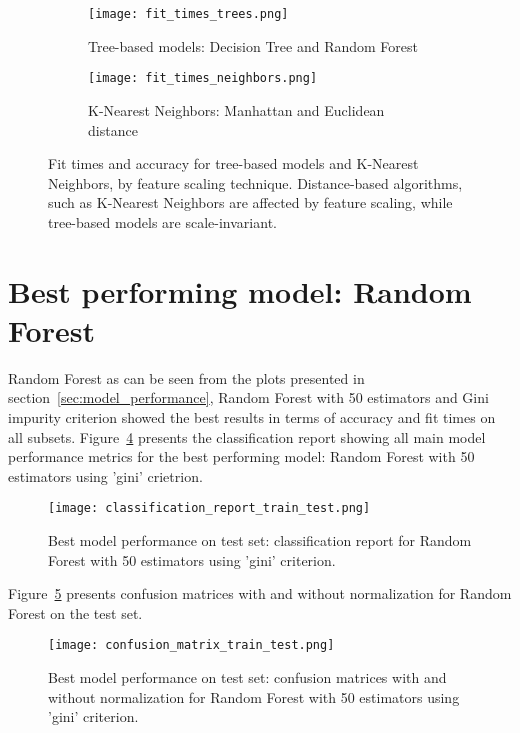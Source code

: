 \begin{figure}[ht]
    \centering
    \begin{subfigure}{\linewidth}
        \centering
        \texttt{[image: fit\_times\_trees.png]}
        \label{fig:fit_times_trees}
        \caption{Tree-based models: Decision Tree and Random Forest}
    \end{subfigure}

    \begin{subfigure}{\linewidth}
        \centering
        \texttt{[image: fit\_times\_neighbors.png]}
        \label{fig:fit_times_neighbors}
        \caption{K-Nearest Neighbors: Manhattan and Euclidean distance}
    \end{subfigure}
    \caption{Fit times and accuracy for tree-based models and K-Nearest Neighbors, by feature scaling technique.
    Distance-based algorithms, such as K-Nearest Neighbors are affected by feature scaling, while tree-based models are scale-invariant.}
    \label{fig:fit_times_trees_neighbors}
\end{figure}

\section{Best performing model: Random Forest} \label{sec:best_performing_model}

Random Forest as can be seen from the plots presented in section~\ref{sec:model_performance}, Random Forest with 50 estimators and Gini impurity criterion showed the best results in terms of accuracy and fit times on all subsets.
Figure~\ref{fig:classification_report_train_test} presents the classification report showing all main model performance metrics for the best performing model: Random Forest with 50 estimators using 'gini' crietrion.

\begin{figure}[hbt!]
    \centering
    \texttt{[image: classification\_report\_train\_test.png]}
    \caption{Best model performance on test set: classification report for Random Forest with 50 estimators using 'gini' criterion.}
    \label{fig:classification_report_train_test}
\end{figure}

Figure~\ref{fig:confusion_matrix_train_test} presents confusion matrices with and without normalization for Random Forest on the test set.

\begin{figure}[hbt!]
    \centering
    \texttt{[image: confusion\_matrix\_train\_test.png]}
    \caption{Best model performance on test set: confusion matrices with and without normalization for Random Forest with 50 estimators using 'gini' criterion.}
    \label{fig:confusion_matrix_train_test}
\end{figure}

